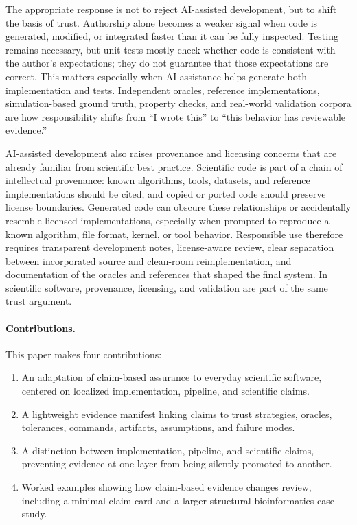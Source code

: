 \documentclass[10pt,twoside]{article}
\newcounter{note}
\begin{document}
The appropriate response is not to reject AI-assisted development, but to shift
the basis of trust. Authorship alone becomes a weaker signal when code is
generated, modified, or integrated faster than it can be fully inspected.
Testing remains necessary, but unit tests mostly check whether code is
consistent with the author's expectations; they do not guarantee that those
expectations are correct. This matters especially when AI assistance helps
generate both implementation and tests. Independent oracles, reference
implementations, simulation-based ground truth, property checks, and real-world
validation corpora are how responsibility shifts from ``I wrote this'' to
``this behavior has reviewable evidence.''

AI-assisted development also raises provenance and licensing concerns that are
already familiar from scientific best practice. Scientific code is part of a
chain of intellectual provenance: known algorithms, tools, datasets, and
reference implementations should be cited, and copied or ported code should
preserve license boundaries. Generated code can obscure these relationships or
accidentally resemble licensed implementations, especially when prompted to
reproduce a known algorithm, file format, kernel, or tool behavior. Responsible
use therefore requires transparent development notes, license-aware review,
clear separation between incorporated source and clean-room reimplementation,
and documentation of the oracles and references that shaped the final system.
In scientific software, provenance, licensing, and validation are part of the
same trust argument.

\paragraph{Contributions.}
This paper makes four contributions:

\begin{enumerate}[leftmargin=*]
  \item An adaptation of claim-based assurance to everyday scientific
        software, centered on localized implementation, pipeline, and
        scientific claims.
  \item A lightweight evidence manifest linking claims to trust strategies,
        oracles, tolerances, commands, artifacts, assumptions, and failure modes.
  \item A distinction between implementation, pipeline, and scientific claims,
        preventing evidence at one layer from being silently promoted to
        another.
  \item Worked examples showing how claim-based evidence changes review,
        including a minimal claim card and a larger structural bioinformatics
        case study.
\end{enumerate}
\end{document}
